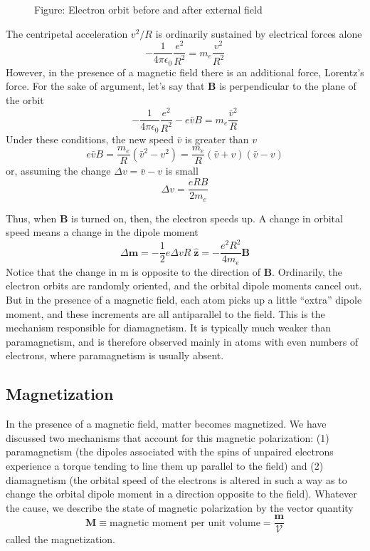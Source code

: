 \documentclass[../../../main.tex]{subfiles}
\begin{document}
\begin{figure*}[b]
    \centering
    \caption*{Figure: Electron orbit before and after external field}
\end{figure*}

The centripetal acceleration $v^2/R$ is ordinarily sustained by electrical forces alone
\begin{equation*}
    -\frac{1}{4\pi \epsilon_0}\frac{e^2}{R^2}=m_e\frac{v^2}{R^2}
\end{equation*}
However, in the presence of a magnetic ﬁeld there is an additional force, Lorentz's force. For the sake of argument, let's say that \textbf{B} is perpendicular to the plane of the orbit
\begin{equation*}
    -\frac{1}{4\pi \epsilon_0}\frac{e^2}{R^2}-e\bar{v}B=m_e\frac{\bar{v}^2}{R}
\end{equation*}
Under these conditions, the new speed $\bar{v}$ is greater than $v$
\begin{equation*}
    e\bar{v}B=\frac{m_e}{R}(\bar{v}^2-v^2)=\frac{m_e}{R}(\bar{v}+v)(\bar{v}-v)
\end{equation*}
or, assuming the change $\Delta v =\bar{v} - v$ is small
\begin{equation*}
    \Delta v =\frac{eRB}{2m_e}
\end{equation*}

Thus, when \textbf{B} is turned on, then, the electron speeds up. A change in orbital speed means a change in the dipole moment
\begin{equation*}
    \Delta\mathbf{m}=-\frac{1}{2}e\Delta v R \;\mathbf{\hat{z}}=-\frac{e^2R^2}{4m_e}\mathbf{B}
\end{equation*}
Notice that the change in m is opposite to the direction of \textbf{B}. Ordinarily, the electron orbits are randomly oriented, and the orbital dipole moments cancel out. But in the presence of a magnetic ﬁeld, each atom picks up a little “extra” dipole moment, and these increments are all antiparallel to the ﬁeld. This is the mechanism responsible for diamagnetism. It is typically much weaker than paramagnetism, and is therefore observed mainly in atoms with even numbers of electrons, where paramagnetism is usually absent.

\subsection*{Magnetization}
In the presence of a magnetic ﬁeld, matter becomes magnetized. We have discussed two mechanisms that account for this magnetic polarization: (1) paramagnetism (the dipoles associated with the spins of unpaired electrons experience a torque tending to line them up parallel to the ﬁeld) and (2) diamagnetism (the orbital speed of the electrons is altered in such a way as to change the orbital dipole moment in a direction opposite to the ﬁeld). Whatever the cause, we describe the state of magnetic polarization by the vector quantity
\begin{equation*}
    \mathbf{M}\equiv\text{magnetic moment per unit volume}=\frac{\mathbf{m}}{\mathcal{V}}
\end{equation*}
called the magnetization. 
\end{document}
